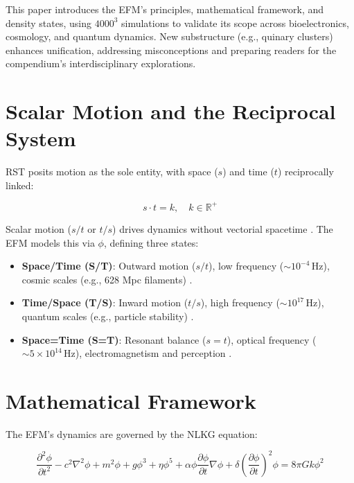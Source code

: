 \documentclass[11pt]{article}
\begin{document}
This paper introduces the EFM’s principles, mathematical framework, and density states, using \(4000^3\) simulations to validate its scope across bioelectronics, cosmology, and quantum dynamics. New substructure (e.g., quinary clusters) enhances unification, addressing misconceptions and preparing readers for the compendium’s interdisciplinary explorations.

\section{Scalar Motion and the Reciprocal System}
RST posits motion as the sole entity, with space (\(s\)) and time (\(t\)) reciprocally linked:

\begin{equation}
s \cdot t = k, \quad k \in \mathbb{R}^{+}
\label{eq:reciprocity}
\end{equation}

Scalar motion (\(s/t\) or \(t/s\)) drives dynamics without vectorial spacetime \citep{larson1959}. The EFM models this via \(\phi\), defining three states:
\begin{itemize}
    \item \textbf{Space/Time (S/T)}: Outward motion (\(s/t\)), low frequency (\(\sim 10^{-4} \, \text{Hz}\)), cosmic scales (e.g., 628 Mpc filaments) \citep{emvula2025bao}.
    \item \textbf{Time/Space (T/S)}: Inward motion (\(t/s\)), high frequency (\(\sim 10^{17} \, \text{Hz}\)), quantum scales (e.g., particle stability) \citep{emvula2025rst}.
    \item \textbf{Space=Time (S=T)}: Resonant balance (\(s = t\)), optical frequency (\(\sim 5 \times 10^{14} \, \text{Hz}\)), electromagnetism and perception \citep{emvula2025compendium}.
\end{itemize}

\section{Mathematical Framework}
The EFM’s dynamics are governed by the NLKG equation:

\begin{equation}
\frac{\partial^2 \phi}{\partial t^2} - c^2 \nabla^2 \phi + m^2 \phi + g \phi^3 + \eta \phi^5 + \alpha \phi \frac{\partial \phi}{\partial t} \nabla \phi + \delta \left( \frac{\partial \phi}{\partial t} \right)^2 \phi = 8 \pi G k \phi^2
\label{eq:nlkg}
\end{equation}
\end{document}
